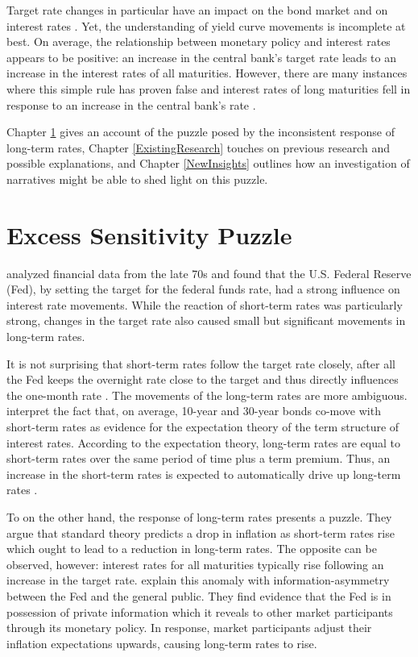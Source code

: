 \documentclass[11pt,a4paper,english,oneside]{book}
\numberwithin{equation}{chapter}
\begin{document}
Target rate changes in particular have an impact on the bond market and on interest rates \citep[p. 332]{Cook.1989}. %
Yet, the understanding of yield curve movements is incomplete at best. On average, the relationship between monetary policy and interest rates appears to be positive: an increase in the central bank's target rate leads to an increase in the interest rates of all maturities. However, there are many instances where this simple rule has proven false and interest rates of long maturities fell in response to an increase in the central bank's rate \citep[p. 1594]{Ellingsen.2001}. 

Chapter \ref{SensitivityPuzzle} gives an account of the puzzle posed by the inconsistent response of long-term rates, Chapter \ref{ExistingResearch} touches on previous research and possible explanations, and Chapter  \ref{NewInsights} outlines how an investigation of narratives might be able to shed light on this puzzle.


\section{Excess Sensitivity Puzzle} \label{SensitivityPuzzle}

\cite{Cook.1989} analyzed financial data from the late 70s and found that the U.S. Federal Reserve (Fed), by setting the target for the federal funds rate, had a strong influence on interest rate movements. While the reaction of short-term rates was particularly strong, changes in the target rate also caused small but significant movements in long-term rates. 
 
It is not surprising that short-term rates follow the target rate closely, after all the Fed keeps the overnight rate close to the target and thus directly influences the one-month rate \citep[p. 1]{Ellingsen.2003}. The movements of the long-term rates are more ambiguous. \citet[pp. 343--346]{Cook.1989} interpret the fact that, on average, 10-year and 30-year bonds co-move with short-term rates as evidence for the expectation theory of the term structure of interest rates. According to the expectation theory, long-term rates are equal to short-term rates over the same period of time plus a term premium. Thus, an increase in the short-term rates is expected to automatically drive up long-term rates \citep[p. 1594]{Ellingsen.2001}.

To \cite{Romer.2000} on the other hand, the response of long-term rates presents a puzzle. They argue that standard theory predicts a drop in inflation as short-term rates rise which ought to lead to a reduction in long-term rates. The opposite can be observed, however: interest rates for all maturities typically rise following an increase in the target rate. \cite{Romer.2000} explain this anomaly with information-asymmetry between the Fed and the general public. They find evidence that the Fed is in possession of private information which it reveals to other market participants through its monetary policy. In response, market participants adjust their inflation expectations upwards, causing long-term rates to rise.
\end{document}
